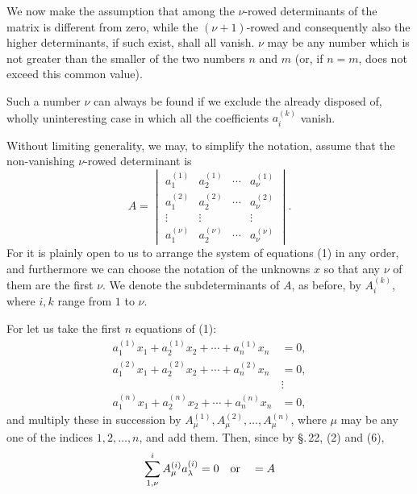 
We now make the assumption that among the \(\nu\)-rowed determinants of the matrix  is different from zero, while the \((\nu+1)\)-rowed and consequently also the higher determinants, if such exist, shall all vanish. \(\nu\) may be any number which is not greater than the smaller of the two numbers \(n\) and \(m\) (or, if \(n=m\), does not exceed this common value).

Such a number \(\nu\) can always be found if we exclude the already disposed of, wholly uninteresting case in which all the coefficients \(a_i^{(k)}\) vanish.

Without limiting generality, we may, to simplify the notation, assume that the non-vanishing \(\nu\)-rowed determinant is
\begin{equation}
        A=\begin{vmatrix}
        a_1^{(1)}&a_2^{(1)}&\cdots&a_\nu^{(1)}\\
        a_1^{(2)}&a_2^{(2)}&\cdots&a_\nu^{(2)}\\
        \vdots&\vdots&&\vdots\\
        a_1^{(\nu)}&a_2^{(\nu)}&\cdots&a_\nu^{(\nu)}
        \end{vmatrix}.
\tag{4}
\end{equation}
For it is plainly open to us to arrange the system of equations (1) in any order, and furthermore we can choose the notation of the unknowns \(x\) so that any \(\nu\) of them are the first \(\nu\). We denote the subdeterminants of \(A\), as before, by \(A_i^{(k)}\), where \(i,k\) range from \(1\) to \(\nu\).


For let us take the first \(n\) equations of (1):
\begin{equation}
\begin{aligned}
 a_1^{(1)}x_1+a_2^{(1)}x_2+\cdots+a_n^{(1)}x_n&=0,\\
 a_1^{(2)}x_1+a_2^{(2)}x_2+\cdots+a_n^{(2)}x_n&=0,\\
 &\vdots\\
 a_1^{(n)}x_1+a_2^{(n)}x_2+\cdots+a_n^{(n)}x_n&=0,
\end{aligned}
\tag{5}
\end{equation}
and multiply these in succession by \(A_\mu^{(1)},A_\mu^{(2)},\ldots,A_\mu^{(n)}\), where \(\mu\) may be any one of the indices \(1,2,\ldots,n\), and add them. Then, since by \S.\,22, (2) and (6),
\[
 \sum_{1,\nu}^{i} A_\mu^{(i)}a_\lambda^{(i)}=0\quad\hbox{or}\quad=A
\]
